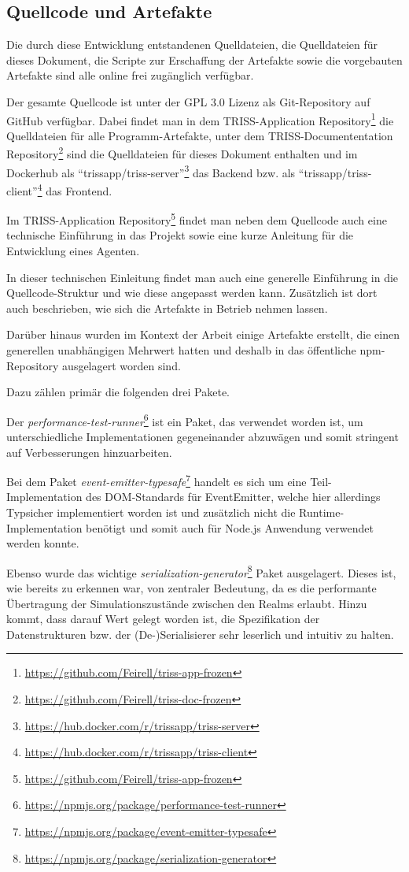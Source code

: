 \subsection{Quellcode und Artefakte} \label{sec:artefacts}

Die durch diese Entwicklung entstandenen Quelldateien, die Quelldateien für dieses Dokument, die Scripte zur Erschaffung der Artefakte sowie die vorgebauten Artefakte sind alle online frei zugänglich verfügbar.

Der gesamte Quellcode ist unter der GPL 3.0 Lizenz als Git-Repository auf GitHub verfügbar.
Dabei findet man in dem TRISS-Application Repository\footnote{\url{https://github.com/Feirell/triss-app-frozen}} die Quelldateien für alle Programm-Artefakte, unter dem TRISS-Documententation Repository\footnote{\url{https://github.com/Feirell/triss-doc-frozen}} sind die Quelldateien für dieses Dokument enthalten und im Dockerhub als \enquote{trissapp/triss-server}\footnote{\url{https://hub.docker.com/r/trissapp/triss-server}} das Backend bzw. als \enquote{trissapp/triss-client}\footnote{\url{https://hub.docker.com/r/trissapp/triss-client}} das Frontend.

Im TRISS-Application Repository\footnote{\url{https://github.com/Feirell/triss-app-frozen}} findet man neben dem Quellcode auch eine technische Einführung in das Projekt sowie eine kurze Anleitung für die Entwicklung eines Agenten.

In dieser technischen Einleitung findet man auch eine generelle Einführung in die Quellcode-Struktur und wie diese angepasst werden kann.
Zusätzlich ist dort auch beschrieben, wie sich die Artefakte in Betrieb nehmen lassen.

Darüber hinaus wurden im Kontext der Arbeit einige Artefakte erstellt, die einen generellen unabhängigen Mehrwert hatten und deshalb in das öffentliche npm-Repository ausgelagert worden sind.

Dazu zählen primär die folgenden drei Pakete.

Der \textit{performance-test-runner}\footnote{\url{https://npmjs.org/package/performance-test-runner}} ist ein Paket, das verwendet worden ist, um unterschiedliche Implementationen gegeneinander abzuwägen und somit stringent auf Verbesserungen hinzuarbeiten.

Bei dem Paket \textit{event-emitter-typesafe}\footnote{\url{https://npmjs.org/package/event-emitter-typesafe}} handelt es sich um eine Teil-Implementation des DOM-Standards für EventEmitter\autocite{domSpecEvent2022}, welche hier allerdings Typsicher implementiert worden ist und zusätzlich nicht die Runtime-Implementation benötigt und somit auch für Node.js Anwendung verwendet werden konnte.

Ebenso wurde das wichtige \textit{serialization-generator}\footnote{\url{https://npmjs.org/package/serialization-generator}} Paket ausgelagert.
Dieses ist, wie bereits zu erkennen war, von zentraler Bedeutung, da es die performante Übertragung der Simulationszustände zwischen den Realms erlaubt.
Hinzu kommt, dass darauf Wert gelegt worden ist, die Spezifikation der Datenstrukturen bzw. der (De-)Serialisierer sehr leserlich und intuitiv zu halten.
